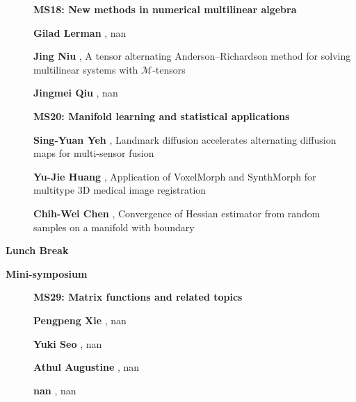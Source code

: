 \documentclass[ILAS2025-program.tex]{subfiles}
\begin{document}
\begin{description}
\begin{description}
        \end{description}
    \begin{description}
    \item[] {\color{mstitle}\textbf{MS18: New methods in numerical multilinear algebra}} 
    \item[] \textbf{Gilad Lerman} , nan
        \item[] \textbf{Jing Niu} , A tensor alternating Anderson--Richardson method for solving multilinear systems with $ \mathcal{M} $-tensors
        \item[] \textbf{Jingmei Qiu} , nan
        \end{description}
    \begin{description}
    \item[] {\color{mstitle}\textbf{MS20: Manifold learning and statistical applications}} 
    \item[] \textbf{Sing-Yuan Yeh} , Landmark diffusion accelerates alternating diffusion maps for multi-sensor fusion
        \item[] \textbf{Yu-Jie Huang} , Application of VoxelMorph and SynthMorph for multitype 3D medical image registration
        \item[] \textbf{Chih-Wei Chen} , Convergence of Hessian estimator from random samples on a manifold with boundary
        \end{description}
    \item[\info{12:00\textrm{--}13:30}] \textbf{Lunch Break} \info{}
    \item[\info{13:30\textrm{--}15:30}] \textbf{Mini-symposium} 
    \begin{description}
    \item[] {\color{mstitle}\textbf{MS29: Matrix functions and related topics}} 
    \item[] \textbf{Pengpeng Xie} , nan
        \item[] \textbf{Yuki Seo} , nan
        \item[] \textbf{Athul Augustine} , nan
        \item[] \textbf{nan} , nan
        \end{description}
    \begin{description}

\end{description}
\end{description}
\end{document}
